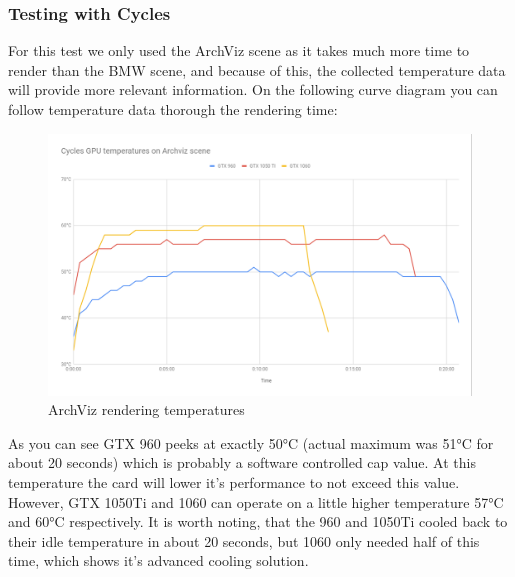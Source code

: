 \documentclass[conference]{IEEEtran}
\begin{document}
    \subsubsection{Testing with Cycles}
        For this test we only used the ArchViz scene as it takes much more time to render than the BMW scene, and because of this, the collected temperature data will provide more relevant information. On the following curve diagram you can follow temperature data thorough the rendering time:
        \begin{figure}[htbp]
            \centering
            \includegraphics[scale=0.3]{Images/cycles_archviz_gpu_graph.png}
            \caption{ArchViz rendering temperatures}
            \label{cycles_temp}
        \end{figure}
        As you can see GTX 960 peeks at exactly 50°C (actual maximum was 51°C for about 20 seconds) which is probably a software controlled cap value. At this temperature the card will lower it's performance to not exceed this value. However, GTX 1050Ti and 1060 can operate on a little higher temperature 57°C and 60°C respectively. It is worth noting, that the 960 and 1050Ti cooled back to their idle temperature in about 20 seconds, but 1060 only needed half of this time, which shows it's advanced cooling solution.
        
\end{document}
